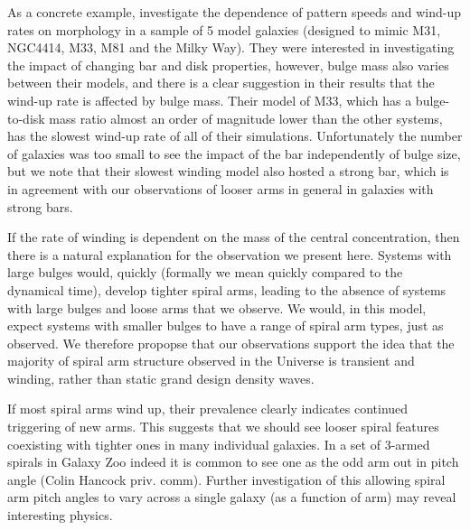 \documentclass[usenatbib]{mn2e}
\begin{document}
  As a concrete example, \citet{PettittWadsley2018} investigate the dependence of pattern speeds and wind-up rates on morphology in a sample of 5 model galaxies (designed to mimic M31, NGC4414, M33, M81 and the Milky Way). They were interested in investigating the impact of changing bar and disk properties, however, bulge mass also varies between their models, and there is a clear suggestion in their results that the wind-up rate is affected by bulge mass. Their model of M33, which has a bulge-to-disk mass ratio almost an order of magnitude lower than the other systems, has the slowest wind-up rate of all of their simulations. Unfortunately the number of galaxies was too small to see the impact of the bar independently of bulge size, but we note that their slowest winding model also hosted a strong bar, which is in agreement with our observations of looser arms in general in galaxies with strong bars.

If the rate of winding is dependent on the mass of the central concentration, then there is a natural explanation for the observation we present here. Systems with large bulges would, quickly (formally we mean quickly compared to the dynamical time), develop tighter spiral arms, leading to the absence of systems with large bulges and loose arms that we observe. We would, in this model, expect systems with smaller bulges to have a range of spiral arm types, just as observed. We therefore propopse that our observations support the idea that the majority of spiral arm structure observed in the Universe is transient and winding, rather than static grand design density waves. 

If most spiral arms wind up, their prevalence clearly indicates continued triggering of new arms. This suggests that we should see
looser spiral features coexisting with tighter ones in many individual galaxies. In a set of 3-armed spirals in Galaxy Zoo indeed it is 
common to see one as the odd arm out in pitch angle (Colin Hancock priv. comm). Further investigation of this allowing spiral arm pitch angles to vary across a single galaxy (as a function of arm) may reveal interesting physics. 
\end{document}
